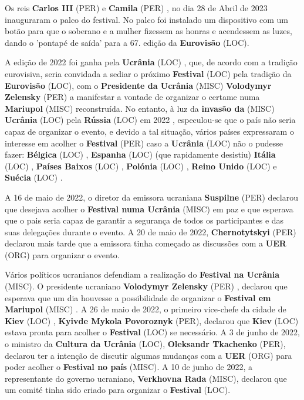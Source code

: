 \documentclass[12pt,a4paper]{article}
\begin{document}
Os reis \textbf{Carlos III} (PER) e \textbf{Camila} (PER) , no dia 28 de Abril de 2023 inauguraram o palco do festival. No palco foi instalado um dispositivo com um botão para que o soberano e a mulher fizessem as honras e acendessem as luzes, dando o 'pontapé de saída' para a 67. edição da \textbf{Eurovisão} (LOC).

A edição de 2022 foi ganha pela \textbf{Ucrânia} (LOC) , que, de acordo com a tradição eurovisiva, seria convidada a sediar o próximo \textbf{Festival} (LOC) pela tradição da \textbf{Eurovisão} (LOC), com o \textbf{Presidente da Ucrânia} (MISC) \textbf{Volodymyr Zelensky} (PER) a manifestar a vontade de organizar o certame numa \textbf{Mariupol} (MISC) reconstruída. No entanto, à luz da \textbf{invasão da} (MISC) \textbf{Ucrânia} (LOC) pela \textbf{Rússia} (LOC) em 2022 , especulou-se que o país não seria capaz de organizar o evento, e devido a tal situação, vários países expressaram o interesse em acolher o \textbf{Festival} (PER) caso a \textbf{Ucrânia} (LOC) não o pudesse fazer: \textbf{Bélgica} (LOC) , \textbf{Espanha} (LOC) (que rapidamente desistiu) \textbf{Itália} (LOC) , \textbf{Países Baixos} (LOC) , \textbf{Polónia} (LOC) , \textbf{Reino Unido} (LOC) e \textbf{Suécia} (LOC) .

A 16 de maio de 2022, o diretor da emissora ucraniana \textbf{Suspilne} (PER) declarou que desejava acolher o \textbf{Festival numa Ucrânia} (MISC) em paz e que esperava que o pais seria capaz de garantir a segurança de todos os participantes e das suas delegações durante o evento. A 20 de maio de 2022, \textbf{Chernotytskyi} (PER) declarou mais tarde que a emissora tinha começado as discussões com a \textbf{UER} (ORG) para organizar o evento.

Vários políticos ucranianos defendiam a realização do \textbf{Festival na Ucrânia} (MISC). O presidente ucraniano \textbf{Volodymyr Zelensky} (PER) , declarou que esperava que um dia houvesse a possibilidade de organizar o \textbf{Festival em Mariupol} (MISC) . A 26 de maio de 2022, o primeiro vice-chefe da cidade de \textbf{Kiev} (LOC) , \textbf{Kyivde Mykola Povoroznyk} (PER), declarou que \textbf{Kiev} (LOC) estava pronta para acolher o \textbf{Festival} (LOC) se necessário. A 3 de junho de 2022, o ministro da \textbf{Cultura da Ucrânia} (LOC), \textbf{Oleksandr Tkachenko} (PER), declarou ter a intenção de discutir algumas mudanças com a \textbf{UER} (ORG) para poder acolher o \textbf{Festival no país} (MISC). A 10 de junho de 2022, a representante do governo ucraniano, \textbf{Verkhovna Rada} (MISC), declarou que um comité tinha sido criado para organizar o \textbf{Festival} (LOC).
\end{document}

